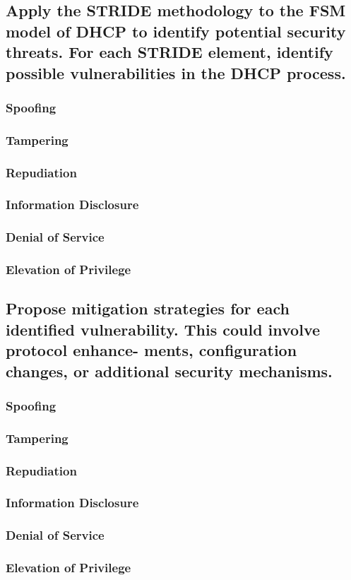 \documentclass{article}
\begin{document}
\subsection{Apply the STRIDE methodology to the FSM model of DHCP to identify potential security threats.
For each STRIDE element, identify possible vulnerabilities in the DHCP process.}

\subsubsection{Spoofing}

\subsubsection{Tampering}

\subsubsection{Repudiation}

\subsubsection{Information Disclosure}

\subsubsection{Denial of Service}

\subsubsection{Elevation of Privilege}

\subsection{Propose mitigation strategies for each identified vulnerability. This could involve protocol enhance-
ments, configuration changes, or additional security mechanisms.}

\subsubsection{Spoofing}

\subsubsection{Tampering}

\subsubsection{Repudiation}

\subsubsection{Information Disclosure}

\subsubsection{Denial of Service}

\subsubsection{Elevation of Privilege}
\end{document}
